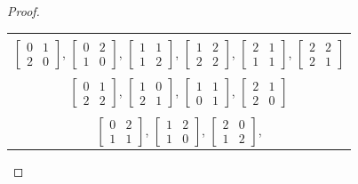 \documentclass[12pt, psamsfonts]{amsart}
\theoremstyle{definition}
\theoremstyle{remark}
\numberwithin{equation}{section}
\begin{document}
\begin{proof}
\begin{enumerate}
      \begin{center}
        \begin{tabular}{|c|}
          \hline \\
            $\begin{bmatrix} 0 & 1 \\ 2 & 0 \end{bmatrix}$,
            $\begin{bmatrix} 0 & 2 \\ 1 & 0 \end{bmatrix}$,
            $\begin{bmatrix} 1 & 1 \\ 1 & 2 \end{bmatrix}$,
            $\begin{bmatrix} 1 & 2 \\ 2 & 2 \end{bmatrix}$,
            $\begin{bmatrix} 2 & 1 \\ 1 & 1 \end{bmatrix}$,
            $\begin{bmatrix} 2 & 2 \\ 2 & 1 \end{bmatrix}$ \\
          \hline \\
            $\begin{bmatrix} 0 & 1 \\ 2 & 2 \end{bmatrix}$,
            $\begin{bmatrix} 1 & 0 \\ 2 & 1 \end{bmatrix}$,
            $\begin{bmatrix} 1 & 1 \\ 0 & 1 \end{bmatrix}$,
            $\begin{bmatrix} 2 & 1 \\ 2 & 0 \end{bmatrix}$ \\
          \hline \\
            $\begin{bmatrix} 0 & 2 \\ 1 & 1 \end{bmatrix}$,
            $\begin{bmatrix} 1 & 2 \\ 1 & 0 \end{bmatrix}$,
            $\begin{bmatrix} 2 & 0 \\ 1 & 2 \end{bmatrix}$,

\end{tabular}
\end{center}
\end{enumerate}
\end{proof}
\end{document}
